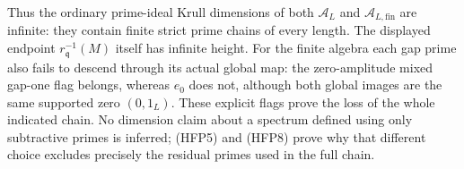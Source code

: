 Thus the ordinary prime-ideal Krull dimensions of both
$\mathcal A_L$ and $\mathcal A_{L,\mathrm{fin}}$ are infinite:
they contain finite strict prime chains of every length.
The displayed endpoint $r_{\mathfrak q}^{-1}(M)$ itself
has infinite height. For the finite algebra each gap
prime also fails to descend through its actual global
map: the zero-amplitude mixed gap-one flag belongs,
whereas $e_0$ does not, although both global images
are the same supported zero $(0,1_L)$. These explicit
flags prove the loss of the whole indicated chain.
No dimension claim about a spectrum defined using only
subtractive primes is inferred; (HFP5) and (HFP8) prove
why that different choice excludes precisely the
residual primes used in the full chain.
